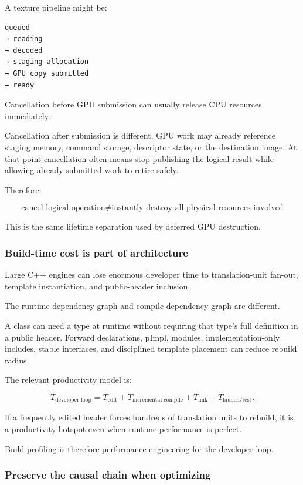 A texture pipeline might be:

\begin{verbatim}
queued
→ reading
→ decoded
→ staging allocation
→ GPU copy submitted
→ ready
\end{verbatim}

Cancellation before GPU submission can usually release CPU resources immediately.

Cancellation after submission is different. GPU work may already reference staging memory, command storage, descriptor state, or the destination image. At that point cancellation often means stop publishing the logical result while allowing already-submitted work to retire safely.

Therefore:

\[
\boxed{
\text{cancel logical operation}
\neq
\text{instantly destroy all physical resources involved}
}
\]

This is the same lifetime separation used by deferred GPU destruction.

\subsubsection{Build-time cost is part of architecture}\label{01-foundations-i-ch005-build-time-cost-is-part-of-architecture}

Large C++ engines can lose enormous developer time to translation-unit fan-out, template instantiation, and public-header inclusion.

The runtime dependency graph and compile dependency graph are different.

A class can need a type at runtime without requiring that type's full definition in a public header. Forward declarations, pImpl, modules, implementation-only includes, stable interfaces, and disciplined template placement can reduce rebuild radius.

The relevant productivity model is:

\[
T_{\text{developer loop}}
=
T_{\text{edit}}
+
T_{\text{incremental compile}}
+
T_{\text{link}}
+
T_{\text{launch/test}}.
\]

If a frequently edited header forces hundreds of translation units to rebuild, it is a productivity hotspot even when runtime performance is perfect.

Build profiling is therefore performance engineering for the developer loop.

\subsubsection{Preserve the causal chain when optimizing}\label{01-foundations-i-ch005-preserve-the-causal-chain-when-optimizing}

